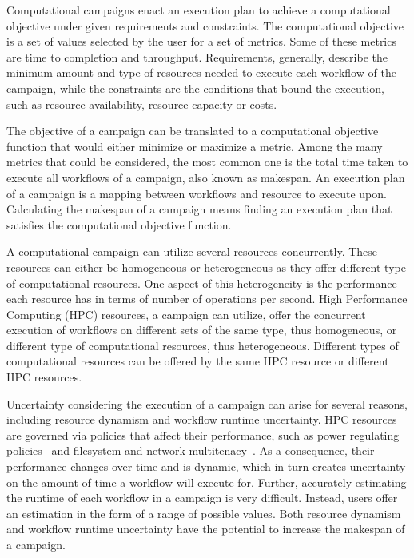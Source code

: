 \label{ch:campaigns}
Computational campaigns enact an execution plan to achieve a computational objective under given requirements and constraints.
The computational objective is a set of values selected by the user for a set of metrics.
Some of these metrics are time to completion and throughput.
Requirements, generally, describe the minimum amount and type of resources needed to execute each workflow of the campaign, while the constraints are the conditions that bound the execution, such as resource availability, resource capacity or costs.

The objective of a campaign can be translated to a computational objective function that would either minimize or maximize a metric.
Among the many metrics that could be considered, the most common one is the total time taken to execute all workflows of a campaign, also known as makespan.
An execution plan of a campaign is a mapping between workflows and resource to execute upon.
Calculating the makespan of a campaign means finding an execution plan that satisfies the computational objective function.

A computational campaign can utilize several resources concurrently.
These resources can either be homogeneous or heterogeneous as they offer different type of computational resources.
One aspect of this heterogeneity is the performance each resource has in terms of number of operations per second.
High Performance Computing (HPC) resources, a campaign can utilize, offer the concurrent execution of workflows on different sets of the same type, thus homogeneous, or different type of computational resources, thus heterogeneous.
Different types of computational resources can be offered by the same HPC resource or different HPC resources.

Uncertainty considering the execution of a campaign can arise for several reasons, including resource dynamism and workflow runtime uncertainty.
HPC resources are governed via policies that affect their performance, such as power regulating policies~\cite{inadomi2015analyzing} and filesystem and network  multitenacy~\cite{brown2018interference}.
As a consequence, their performance changes over time and is dynamic, which in turn creates uncertainty on the amount of time a workflow will execute for.
Further, accurately estimating the runtime of each workflow in a campaign is very difficult.
Instead, users offer an estimation in the form of a range of possible values.
Both resource dynamism and workflow runtime uncertainty have the potential to increase the makespan of a campaign.

